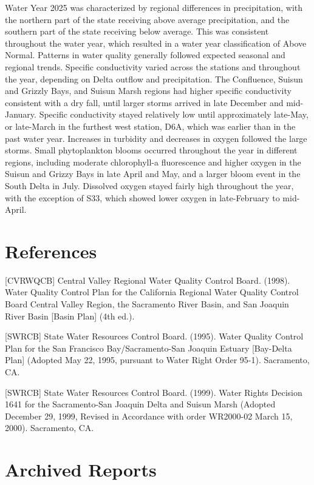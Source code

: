 \documentclass[
  letterpaper,
]{article}
\begin{document}
Water Year 2025 was characterized by regional differences in
precipitation, with the northern part of the state receiving above
average precipitation, and the southern part of the state receiving
below average. This was consistent throughout the water year, which
resulted in a water year classification of Above Normal. Patterns in
water quality generally followed expected seasonal and regional trends.
Specific conductivity varied across the stations and throughout the
year, depending on Delta outflow and precipitation. The Confluence,
Suisun and Grizzly Bays, and Suisun Marsh regions had higher specific
conductivity consistent with a dry fall, until larger storms arrived in
late December and mid-January. Specific conductivity stayed relatively
low until approximately late-May, or late-March in the furthest west
station, D6A, which was earlier than in the past water year. Increases
in turbidity and decreases in oxygen followed the large storms. Small
phytoplankton blooms occurred throughout the year in different regions,
including moderate chlorophyll-a fluorescence and higher oxygen in the
Suisun and Grizzy Bays in late April and May, and a larger bloom event
in the South Delta in July. Dissolved oxygen stayed fairly high
throughout the year, with the exception of S33, which showed lower
oxygen in late-February to mid-April.

\section{References}\label{references}

{[}CVRWQCB{]} Central Valley Regional Water Quality Control Board.
(1998). Water Quality Control Plan for the California Regional Water
Quality Control Board Central Valley Region, the Sacramento River Basin,
and San Joaquin River Basin {[}Basin Plan{]} (4th ed.).

{[}SWRCB{]} State Water Resources Control Board. (1995). Water Quality
Control Plan for the San Francisco Bay/Sacramento-San Joaquin Estuary
{[}Bay-Delta Plan{]} (Adopted May 22, 1995, pursuant to Water Right
Order 95-1). Sacramento, CA.

{[}SWRCB{]} State Water Resources Control Board. (1999). Water Rights
Decision 1641 for the Sacramento-San Joaquin Delta and Suisun Marsh
(Adopted December 29, 1999, Revised in Accordance with order WR2000-02
March 15, 2000). Sacramento, CA.

\section{Archived Reports}\label{archived-reports}
\end{document}
